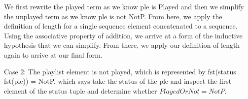 \documentclass[a4paper,10pt,fleqn]{article}
\begin{document}
\bigskip

\begin{center}
\end{center}
\bigskip

\noindent We first rewrite the played term as we know ple is Played and then we simplify the unplayed term as we know ple is not NotP. From here, we apply the definition of length for a single sequence element concatenated to a sequence. Using the associative property of addition, we arrive at a form of the inductive hypothesis that we can simplify.  From there, we apply our definition of length again to arrive at our final form.

\bigskip

\noindent Case 2: The playlist element is not played, which is represented by fst(status fst(ple)) = NotP, which says take the status of the ple and inspect the first element of the status tuple and determine whether $PlayedOrNot = NotP$.

\bigskip
\end{document}
